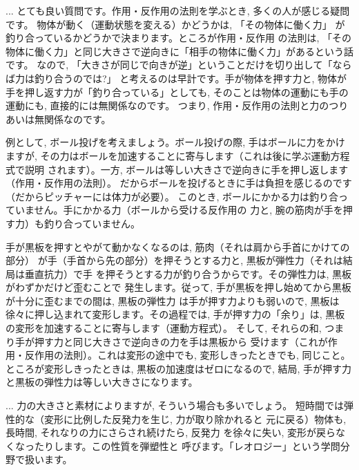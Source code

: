 \begin{faq}{\small{}
... とても良い質問です。作用・反作用の法則を学ぶとき, 多くの人が感じる疑問です。
物体が動く（運動状態を変える）かどうかは, 「その物体に働く力」
が釣り合っているかどうかで決まります。ところが作用・反作用
の法則は, 「その物体に働く力」と同じ大きさで逆向きに「相手の物体に働く力」があるという話です。
なので, 「大きさが同じで向きが逆」ということだけを切り出して「ならば力は釣り合うのでは?」
と考えるのは早計です。手が物体を押す力と, 物体が手を押し返す力が「釣り合っている」としても, 
そのことは物体の運動にも手の運動にも, 直接的には無関係なのです。
つまり, 作用・反作用の法則と力のつりあいは無関係なのです。

例として, ボール投げを考えましょう。ボール投げの際, 手はボールに力をかけますが, 
その力はボールを加速することに寄与します（これは後に学ぶ運動方程式で説明
されます）。一方, ボールは等しい大きさで逆向きに手を押し返します（作用・反作用の法則）。
だからボールを投げるときに手は負担を感じるのです（だからピッチャーには体力が必要）。
このとき, ボールにかかる力は釣り合っていません。手にかかる力（ボールから受ける反作用の
力と, 腕の筋肉が手を押す力）も釣り合っていません。

手が黒板を押すとやがて動かなくなるのは, 筋肉（それは肩から手首にかけての部分）
が手（手首から先の部分）を押そうとする力と, 黒板が弾性力（それは結局は垂直抗力）で手
を押そうとする力が釣り合うからです。その弾性力は, 黒板がわずかだけど歪むことで
発生します。従って, 手が黒板を押し始めてから黒板が十分に歪むまでの間は, 黒板の弾性力
は手が押す力よりも弱いので, 黒板は徐々に押し込まれて変形します。その過程では, 
手が押す力の「余り」は, 黒板の変形を加速することに寄与します（運動方程式）。
そして, それらの和, つまり手が押す力と同じ大きさで逆向きの力を手は黒板から
受けます（これが作用・反作用の法則）。これは変形の途中でも, 変形しきったときでも, 
同じこと。ところが変形しきったときは, 黒板の加速度はゼロになるので, 
結局, 手が押す力と黒板の弾性力は等しい大きさになります。}\end{faq}

\begin{faq}{\small{}
... 力の大きさと素材によりますが, そういう場合も多いでしょう。
短時間では弾性的な（変形に比例した反発力を生じ, 力が取り除かれると
元に戻る）物体も, 長時間, それなりの力にさらされ続けたら, 反発力
を徐々に失い, 変形が戻らなくなったりします。この性質を弾塑性と
呼びます。「レオロジー」という学問分野で扱います。}\end{faq}
\hv


